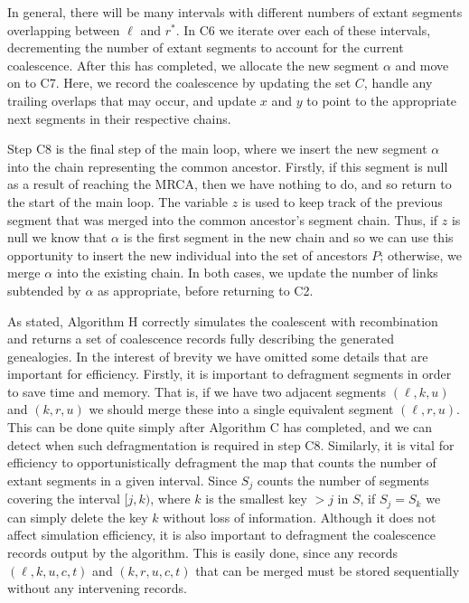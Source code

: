 \documentclass[10pt]{article}
\newcommand{\algref}[1]{#1}
\begin{document}
In general, there will be many intervals with different numbers of extant
segments overlapping between $\ell$ and $r^\ast$. In \algref{C6} we
iterate over each of these intervals, decrementing the number of extant
segments to account for the current coalescence. After this has completed,
we allocate the new segment $\alpha$ and move on to \algref{C7}. Here,
we record the coalescence by updating the set $C$, handle
any trailing overlaps that may occur, and update $x$ and $y$ to point
to the appropriate next segments in their respective chains.

Step \algref{C8} is the final step of the main loop,
where we insert the new segment $\alpha$ into the
chain representing the common ancestor. Firstly, if this segment is null as a
result of reaching the MRCA, then we have nothing to do, and so return to the
start of the main loop. The variable $z$ is used to keep track of the
previous segment that was merged into the common ancestor's segment chain.
Thus, if $z$ is null we know that $\alpha$ is the first segment in the
new chain and so we can use this opportunity to insert the new
individual into the set of ancestors $P$; otherwise, we merge $\alpha$
into the existing chain. In both cases, we update the number of links
subtended by $\alpha$ as appropriate, before returning to \algref{C2}.

As stated, Algorithm H correctly simulates the coalescent with recombination
and returns a set of coalescence records fully describing the generated
genealogies. In the interest of brevity we have omitted some details
that are important for efficiency. Firstly, it is important to defragment
segments in order to save time and memory. That is, if we have two adjacent segments
$(\ell, k, u)$ and $(k, r, u)$ we should merge these into a single equivalent
segment $(\ell, r, u)$. This can be done quite simply after Algorithm C has
completed, and we can detect when such defragmentation is required in step
\algref{C8}. Similarly, it is vital for efficiency to opportunistically
defragment the map that counts the number of extant segments in a given
interval. Since $S_j$ counts the number of segments covering the interval $[j,
k)$, where $k$ is the smallest key $> j$ in $S$, if $S_j = S_k$ we can simply
delete the key $k$ without loss of information. Although it does not
affect simulation efficiency, it is also important to defragment the coalescence
records output by the algorithm. This is easily done, since any records
$(\ell, k, u, c, t)$ and $(k, r, u, c, t)$ that can be merged must be
stored sequentially without any intervening records.
\end{document}
